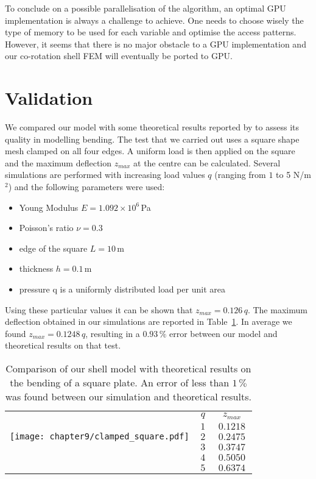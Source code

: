 To conclude on a possible parallelisation of the algorithm, an optimal GPU implementation is always a challenge to achieve. One needs to choose wisely the type of memory to be used for each variable and optimise the access patterns. However, it seems that there is no major obstacle to a GPU implementation and our co-rotation shell FEM will eventually be ported to GPU. 




\section{Validation}

We compared our model with some theoretical results reported by \cite{Zhongnian86} to assess its quality in modelling bending. The test that we carried out uses a square shape mesh clamped on all four edges. A uniform load is then applied on the square and the maximum deflection $z_{max}$ at the centre can be calculated. Several simulations are performed with increasing load values $q$ (ranging from $1$ to 5 N/m$^2$) and the following parameters were used: 
\begin{itemize}
 \item Young Modulus $E = 1.092 \times 10^6\,$Pa
 \item Poisson's ratio $\nu = 0.3$
 \item edge of the square $L = 10\,$m
 \item thickness $h = 0.1\,$m
 \item pressure q is a uniformly distributed load per unit area
\end{itemize}

Using these particular values it can be shown that $z_{max} = 0.126\,q$. The maximum deflection obtained in our simulations are reported in Table~\ref{chap9:tab-results}. In average we found $z_{max} = 0.1248\,q $, resulting in a $0.93\,\%$ error between our model and theoretical results on that test. 
%
\begin{table}[ht]
	\centering
	\begin{tabular}{p{9cm}|c|c|}
	\cline{2-3}
	\multirow{5}{*}{\texttt{[image: chapter9/clamped\_square.pdf]}} & $q$ & $z_{max}$ \tabularnewline
	\cline{2-3}
	& $\,1\,$ & $\, 0.1218 \,$ \tabularnewline
	& $\,2\,$ & $\, 0.2475 \,$ \tabularnewline		
	& $\,3\,$ & $\, 0.3747 \,$ \tabularnewline	
	& $\,4\,$ & $\, 0.5050 \,$ \tabularnewline		
	& $\,5\,$ & $\, 0.6374 \,$ \tabularnewline
	\cline{2-3}
	\end{tabular}
	\vspace{1cm}
	\caption{Comparison of our shell model with theoretical results on the bending of a square plate. An error of less than $1\,\%$ was found between our simulation and theoretical results.}
	\label{chap9:tab-results}
\end{table}

